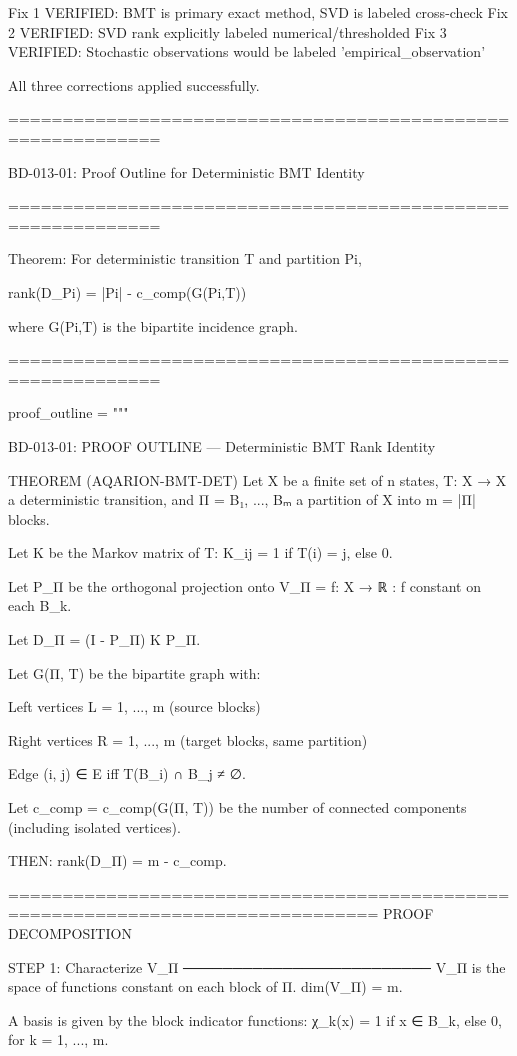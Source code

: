 Fix 1 VERIFIED: BMT is primary exact method, SVD is labeled cross-check
Fix 2 VERIFIED: SVD rank explicitly labeled numerical/thresholded
Fix 3 VERIFIED: Stochastic observations would be labeled 'empirical_observation'

All three corrections applied successfully.

============================================================

BD-013-01: Proof Outline for Deterministic BMT Identity

============================================================

Theorem: For deterministic transition T and partition Pi,

rank(D_Pi) = |Pi| - c_comp(G(Pi,T))

where G(Pi,T) is the bipartite incidence graph.

============================================================

proof_outline = """

BD-013-01: PROOF OUTLINE — Deterministic BMT Rank Identity

THEOREM (AQARION-BMT-DET)
Let X be a finite set of n states, T: X → X a deterministic transition,
and Π = {B₁, ..., Bₘ} a partition of X into m = |Π| blocks.

Let K be the Markov matrix of T:
K_{ij} = 1 if T(i) = j, else 0.

Let P_Π be the orthogonal projection onto V_Π = {f: X → ℝ : f constant on each B_k}.

Let D_Π = (I - P_Π) K P_Π.

Let G(Π, T) be the bipartite graph with:

Left vertices L = {1, ..., m} (source blocks)

Right vertices R = {1, ..., m} (target blocks, same partition)

Edge (i, j) ∈ E iff T(B_i) ∩ B_j ≠ ∅.


Let c_comp = c_comp(G(Π, T)) be the number of connected components
(including isolated vertices).

THEN:
rank(D_Π) = m - c_comp.

================================================================================
PROOF DECOMPOSITION

STEP 1: Characterize V_Π
─────────────────────────
V_Π is the space of functions constant on each block of Π.
dim(V_Π) = m.

A basis is given by the block indicator functions:
χ_k(x) = 1 if x ∈ B_k, else 0,   for k = 1, ..., m.

